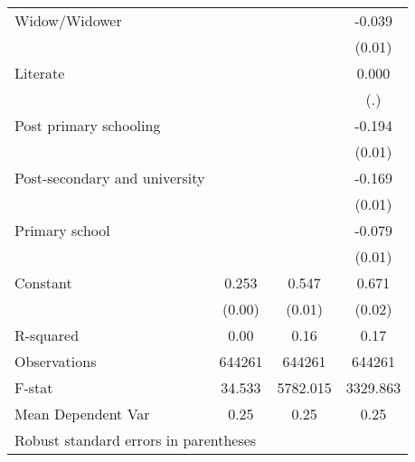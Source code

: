 {\begin{tabular}{l*{3}{c}}
Widow/Widower       &                     &                     &      -0.039\sym{**} \\
                    &                     &                     &      (0.01)         \\
Literate            &                     &                     &       0.000         \\
                    &                     &                     &         (.)         \\
Post primary schooling&                     &                     &      -0.194\sym{***}\\
                    &                     &                     &      (0.01)         \\
Post-secondary and university&                     &                     &      -0.169\sym{***}\\
                    &                     &                     &      (0.01)         \\
Primary school      &                     &                     &      -0.079\sym{***}\\
                    &                     &                     &      (0.01)         \\
Constant            &       0.253\sym{***}&       0.547\sym{***}&       0.671\sym{***}\\
                    &      (0.00)         &      (0.01)         &      (0.02)         \\
\hline
R-squared           &        0.00         &        0.16         &        0.17         \\
Observations        &      644261         &      644261         &      644261         \\
F-stat              &      34.533         &    5782.015         &    3329.863         \\
Mean Dependent Var  &        0.25         &        0.25         &        0.25         \\
\hline\hline
\multicolumn{4}{l}{\footnotesize Robust standard errors in parentheses}\\
\end{tabular}
}
